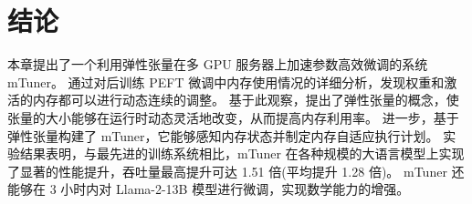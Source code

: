 \section{结论}
本章提出了一个利用弹性张量在多 GPU 服务器上加速参数高效微调的系统 mTuner。
通过对后训练 PEFT 微调中内存使用情况的详细分析，发现权重和激活的内存都可以进行动态连续的调整。
基于此观察，提出了弹性张量的概念，使张量的大小能够在运行时动态灵活地改变，从而提高内存利用率。
进一步，基于弹性张量构建了 mTuner，它能够感知内存状态并制定内存自适应执行计划。
实验结果表明，与最先进的训练系统相比，mTuner 在各种规模的大语言模型上实现了显著的性能提升，吞吐量最高提升可达 1.51 倍(平均提升 1.28 倍)。
mTuner 还能够在 3 小时内对 Llama-2-13B 模型进行微调，实现数学能力的增强。













